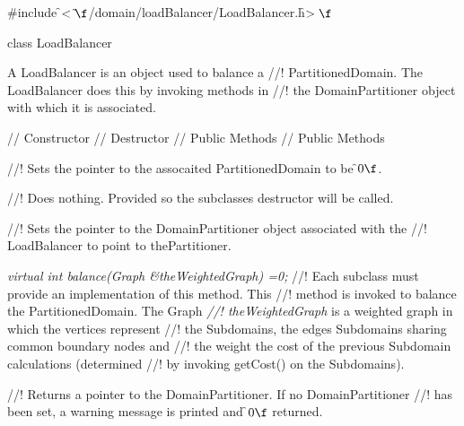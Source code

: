 
\indent \#include \f$<\tilde{ }\f$/domain/loadBalancer/LoadBalancer.h\f$>\f$

\indent class LoadBalancer



\indent A LoadBalancer is an object used to balance a
//! PartitionedDomain. The LoadBalancer does this by invoking methods in
//! the DomainPartitioner object with which it is associated.

\indent\indent  // Constructor
\indent{}
\indent\indent // Destructor
\indent{}
\indent\indent // Public Methods
\indent{} 
\indent{}
\indent\indent // Public Methods
\indent{}


//! Sets the pointer to the assocaited PartitionedDomain to be \f$0\f$.

//! Does nothing. Provided so the subclasses destructor will be called.

//! Sets the pointer to the DomainPartitioner object associated with the
//! LoadBalancer to point to \p thePartitioner.

{\em virtual int balance(Graph \&theWeightedGraph) =0;} 
//! Each subclass must provide an implementation of this method. This
//! method is invoked to balance the PartitionedDomain. The Graph {\em
//! theWeightedGraph} is a weighted graph in which the vertices represent
//! the Subdomains, the edges Subdomains sharing common boundary nodes and
//! the weight the cost of the previous Subdomain calculations (determined
//! by invoking getCost() on the Subdomains).


//! Returns a pointer to the DomainPartitioner. If no DomainPartitioner
//! has been set, a warning message is printed and \f$0\f$ returned.




